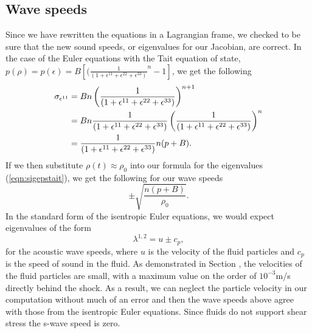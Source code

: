 \documentclass{article}
\begin{document}
\subsection{Wave speeds}
\label{sec:wavespeeds}
Since we have rewritten the equations in a Lagrangian frame, we checked to be sure that the new sound 
speeds, or eigenvalues for our Jacobian, are correct.  In the case of the Euler equations with the Tait 
equation of state, $p(\rho) = p(\epsilon) = B[(\frac{1}{(1+\epsilon^{11} + \epsilon^{22} + 
\epsilon^{33})}^{n} - 1]$, we get the following
\begin{align}
     \sigma_{\epsilon^{11}} &= B n \left( \frac{1}{(1+\epsilon^{11} + \epsilon^{22} + \epsilon^{33})} 
\right )^{n +1} \notag\\
     			&= B n \frac{1}{(1+\epsilon^{11} + \epsilon^{22} + \epsilon^{33})} \left( \frac{1}{(1+
\epsilon^{11} + \epsilon^{22} + \epsilon^{33})} \right )^{n} \label{eqn:sigepstait}\\
			&=  \frac{1}{(1+\epsilon^{11} + \epsilon^{22} + \epsilon^{33})} n (p + B).\notag
\end{align}
If we then substitute $\rho(t) \approx \rho_0$ into our formula for the eigenvalues (\ref{eqn:sigepstait}), 
we get the following for our wave speeds 
\begin{equation}
	\pm \sqrt{\frac{n (p+B)}{\rho_0}}.
\label{eqn:lagisenspeed}
\end{equation}
In the standard form of the isentropic Euler equations, we would expect eigenvalues of the form 
\begin{equation}
	\lambda^{1,2} = u \pm c_p,
\end{equation}
for the acoustic wave speeds, where $u$ is the velocity of the fluid particles and $c_p$ is the speed of 
sound in the fluid.  As demonstrated in Section , the velocities of the fluid particles are small, 
with a maximum value on the order of $10^{-3}$m/s directly behind the shock.  As a result, we can 
neglect the particle velocity in our computation without much of an error and then the wave speeds 
above agree with those from the isentropic Euler equations. Since fluids do not support shear stress the 
s-wave speed is zero.
\end{document}
